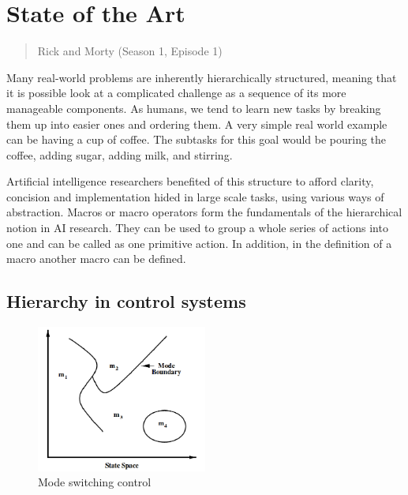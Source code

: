 \chapter{State of the Art}
\label{stateoftheart}
\thispagestyle{empty}

\begin{quotation}
{\footnotesize
{}
\begin{flushright}
Rick and Morty (Season 1, Episode 1)
\end{flushright}
}
\end{quotation}


\vspace{0.5cm}

Many real-world problems are inherently hierarchically structured, meaning that it is possible look at a complicated challenge as a sequence of its more manageable components. As humans, we  tend to learn new tasks by breaking them up into easier ones and ordering them. A very simple real world example can be having a cup of coffee. The subtasks for this goal would be pouring the coffee, adding sugar, adding milk, and stirring. 

Artificial intelligence researchers benefited of this structure to afford clarity, concision and implementation hided in large scale tasks, using various ways of abstraction. Macros or macro operators form the fundamentals of the hierarchical notion in AI research. They can be used to group a whole series of actions into one and can be called as one primitive action. In addition, in the definition of a macro another macro can be defined. 

\section{Hierarchy in control systems}
\begin{figure}[t]
      \centering
      \includegraphics[width = 0.5\textwidth]{./pictures/modeswitching.png}
      \caption{Mode switching control}
      \label{fig:modeswitching} 
\end{figure}

